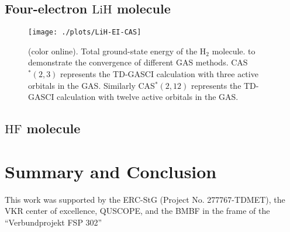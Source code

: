\documentclass[twocolumn,aps,showpacs,superscriptaddress,longbibliography]{revtex4-1}
\begin{document}
\subsection{Four-electron $\mathrm{LiH}$ molecule}
\label{lih}
\begin{figure}
 \texttt{[image: ./plots/LiH-EI-CAS]}
 \caption{(color online). Total ground-state energy of the $\mathrm{H}_2$ molecule.
           to demonstrate the convergence of different GAS methods.
           CAS$^*(2,3)$ represents the TD-GASCI calculation with three active orbitals in the GAS.
           Similarly  CAS$^*(2,12)$ represents the TD-GASCI calculation with twelve active orbitals
           in the GAS.}
 \label{fig:H2-CAS}
\end{figure}




\subsection{$\mathrm{HF}$ molecule}
\label{hf}

\section{Summary and Conclusion}
\label{conc}

\begin{acknowledgments}
This work was supported by the ERC-StG (Project No. 277767-TDMET), the VKR center of excellence, 
QUSCOPE, and the BMBF in the frame of the ``Verbundprojekt FSP 302''

\end{acknowledgments}
{}
\end{document}
